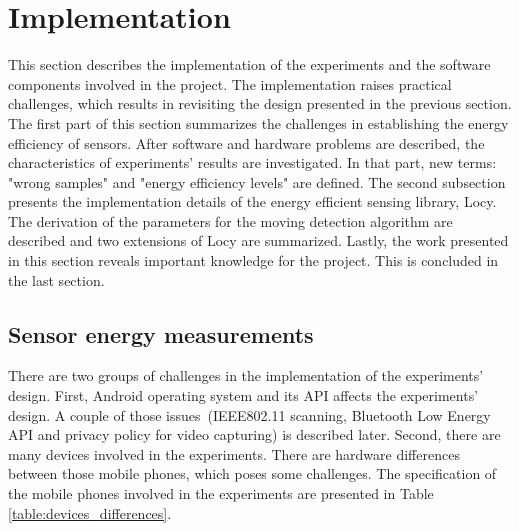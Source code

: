 \section{Implementation}
\label{s:implementation}
\hspace{10pt} This section describes the implementation of the experiments and the software components involved in the project. The implementation raises practical challenges, which results in revisiting the design presented in the previous section. The first part of this section summarizes the challenges in establishing the energy efficiency of sensors. After software and hardware problems are described, the characteristics of experiments' results are investigated. In that part, new terms: "wrong samples" and "energy efficiency levels" are defined. The second subsection presents the implementation details of the energy efficient sensing library, Locy. The derivation of the parameters for the moving detection algorithm are described and two extensions of Locy are summarized. Lastly, the work presented in this section reveals important knowledge for the project. This is concluded in the last section.

\subsection{Sensor energy measurements}
There are two groups of challenges in the implementation of the experiments' design. First, Android operating system and its API affects the experiments' design. A couple of those issues\ (IEEE802.11 scanning, Bluetooth Low Energy API and privacy policy for video capturing) is described later. Second, there are many devices involved in the experiments. There are hardware differences between those mobile phones, which poses some challenges. The specification of the mobile phones involved in the experiments are presented in Table \ref{table:devices_differences}.
	
